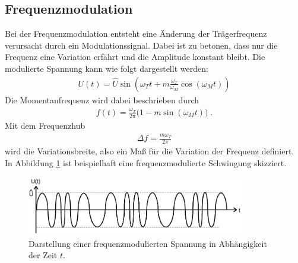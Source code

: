 \subsection{Frequenzmodulation}
\label{sec:Frequenzmodulation}
Bei der Frequenzmodulation entsteht eine Änderung der Trägerfrequenz verursacht durch ein Modulationssignal. Dabei ist zu betonen, dass nur die Frequenz eine Variation erfährt und die Amplitude konstant bleibt. Die modulierte Spannung kann wie folgt dargestellt werden:
\begin{align}
	U(t)=\hat{U}\sin{\left(\omega_Tt+m\frac{\omega_T}{\omega_M}\cos{(\omega_Mt)}\right)}
	\label{eq:2}
\end{align}
Die Momentanfrequenz wird dabei beschrieben durch
\begin{align}
	f(t)=\frac{\omega_T}{2\pi}\Big(1-m\sin{(\omega_Mt)}\Big)\;.
\end{align}
Mit dem Frequenzhub
\begin{align}
	\Delta f=\frac{m\omega_T}{2\pi}
\end{align}
wird die Variationsbreite, also ein Maß für die Variation der Frequenz definiert. In Abbildung \ref{fig_T3} ist beispielhaft eine frequenzmodulierte Schwingung skizziert.

\begin{figure}
    \centering
    \includegraphics[width=0.85\textwidth]{ressources/T3.png}
    \caption{Darstellung einer frequenzmodulierten Spannung in Abhängigkeit der Zeit $t$\cite{skript}.}
    \label{fig_T3}
\end{figure}

